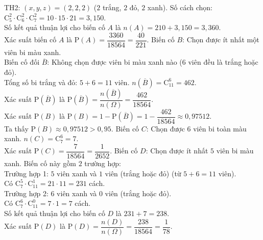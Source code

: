 \begin{ex}
{\begin{itemchoice}
			TH2: $(x, y, z) = (2, 2, 2)$ ($2$ trắng, $2$ đỏ, $2$ xanh). Số cách chọn: $\mathrm{C}_5^2 \cdot \mathrm{C}_6^2 \cdot \mathrm{C}_7^2 = 10 \cdot 15 \cdot 21 = 3{,}150$.\\
			Số kết quả thuận lợi cho biến cố $A$ là $n(A)=210+3{,}150=3{,}360$.\\
			Xác suất biến cố $A$ là $\mathrm{P}(A) = \dfrac{3360}{18564} = \dfrac{40}{221}$.
			\itemch Biến cố $B$: Chọn được ít nhất một viên bi màu xanh.\\
			Biến cố đối $\overline{B}$: Không chọn được viên bi màu xanh nào ($6$ viên đều là trắng hoặc đỏ).\\
			Tổng số bi trắng và đỏ: $5+6=11$ viên.
			$n(\overline{B})=\mathrm{C}_{11}^6=462$.\\
			Xác suất $\mathrm{P}(\overline{B})$ là $\mathrm{P}(\overline{B})=\dfrac{n(\overline{B})}{n(\Omega)}=\dfrac{462}{18564}$.\\
			Xác suất $\mathrm{P}(B)$ là $\mathrm{P}(B)=1-\mathrm{P}(\overline{B})=1-\dfrac{462}{18564} \approx 0{,}97512$.\\
			Ta thấy $\mathrm{P}(B) \approx 0{,}97512 > 0{,}95$.
			\itemch Biến cố $C$: Chọn được $6$ viên bi toàn màu xanh.
			$n(C)=\mathrm{C}_7^6=7$.\\
			Xác suất $\mathrm{P}(C)=\dfrac{7}{18564} = \dfrac{1}{2652}$.
			\itemch Biến cố $D$: Chọn được ít nhất $5$ viên bi màu xanh.
			Biến cố này gồm $2$ trường hợp:\\
			Trường hợp 1: $5$ viên xanh và $1$ viên (trắng hoặc đỏ) (từ $5+6=11$ viên).\\
			Có $\mathrm{C}_7^5 \cdot \mathrm{C}_{11}^1=21 \cdot 11=231$ cách.\\
			Trường hợp 2: $6$ viên xanh và $0$ viên (trắng hoặc đỏ).\\
			Có $\mathrm{C}_7^6 \cdot \mathrm{C}_{11}^0=7 \cdot 1=7$ cách.\\
			Số kết quả thuận lợi cho biến cố $D$ là $231+7=238$.\\
			Xác suất $\mathrm{P}(D)$ là $\mathrm{P}(D)=\dfrac{n(D)}{n(\Omega)}=\dfrac{238}{18564}=\dfrac{1}{78}$.
		\end{itemchoice}
	}
\end{ex}


